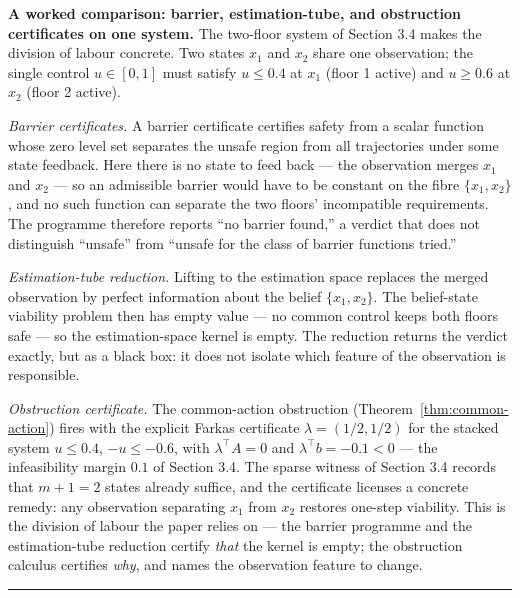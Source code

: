 \documentclass[11pt]{article}
\theoremstyle{definition}
\begin{document}
\textbf{A worked comparison: barrier, estimation-tube, and obstruction certificates on one system.} The two-floor system of Section 3.4 makes the division of labour concrete. Two states \(x_1\) and \(x_2\) share one observation; the single control \(u\in[0,1]\) must satisfy \(u\le 0.4\) at \(x_1\) (floor 1 active) and \(u\ge 0.6\) at \(x_2\) (floor 2 active).

\emph{Barrier certificates.} A barrier certificate certifies safety from a scalar function whose zero level set separates the unsafe region from all trajectories under some state feedback. Here there is no state to feed back --- the observation merges \(x_1\) and \(x_2\) --- so an admissible barrier would have to be constant on the fibre \(\{x_1,x_2\}\), and no such function can separate the two floors' incompatible requirements. The programme therefore reports ``no barrier found,'' a verdict that does not distinguish ``unsafe'' from ``unsafe for the class of barrier functions tried.''

\emph{Estimation-tube reduction.} Lifting to the estimation space replaces the merged observation by perfect information about the belief \(\{x_1,x_2\}\). The belief-state viability problem then has empty value --- no common control keeps both floors safe --- so the estimation-space kernel is empty. The reduction returns the verdict exactly, but as a black box: it does not isolate which feature of the observation is responsible.

\emph{Obstruction certificate.} The common-action obstruction (Theorem~\ref{thm:common-action}) fires with the explicit Farkas certificate \(\lambda=(1/2,1/2)\) for the stacked system \(u\le 0.4\), \(-u\le -0.6\), with \(\lambda^{\top}A=0\) and \(\lambda^{\top}b=-0.1<0\) --- the infeasibility margin \(0.1\) of Section 3.4. The sparse witness of Section 3.4 records that \(m+1=2\) states already suffice, and the certificate licenses a concrete remedy: any observation separating \(x_1\) from \(x_2\) restores one-step viability. This is the division of labour the paper relies on --- the barrier programme and the estimation-tube reduction certify \emph{that} the kernel is empty; the obstruction calculus certifies \emph{why}, and names the observation feature to change.


\begin{center}\rule{0.5\linewidth}{0.5pt}\end{center}
\end{document}
